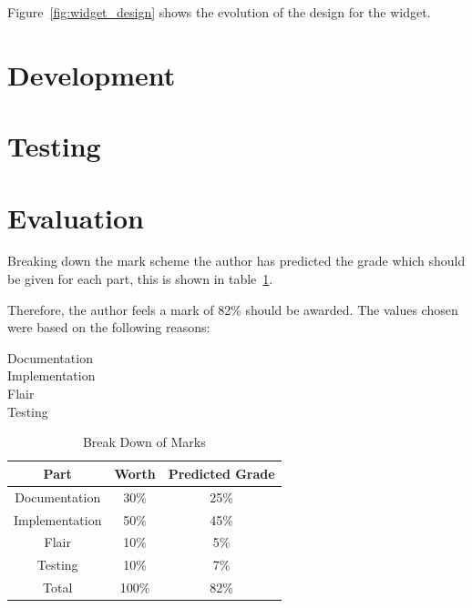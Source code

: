 \documentclass[11pt, a4paper]{article}
\begin{document}
Figure~\ref{fig:widget_design} shows the evolution of the design for the 
widget.

\section{Development}


\section{Testing}


\section{Evaluation}


Breaking down the mark scheme the author has predicted the grade which should 
be given for each part, this is shown in table~\ref{tab:marks}.

Therefore, the author feels a mark of 82\% should be awarded. The values chosen 
were based on the following reasons:

\begin{description}
\item[Documentation] 
\item[Implementation] 
\item[Flair] 
\item[Testing] 
\end{description}

\begin{table}[h]
\centering
\begin{tabular}{|c|c|c|}\hline
\textbf{Part} & \textbf{Worth} & \textbf{Predicted Grade} \\ \hline
Documentation & 30\% & 25\% \\ 
Implementation & 50\% & 45\% \\ 
Flair & 10\% & 5\% \\ 
Testing & 10\% & 7\% \\ \hline
Total & 100\% & 82\% \\ \hline
\end{tabular}
\caption{Break Down of Marks}\label{tab:marks}
\end{table}

\newpage



\end{document}
